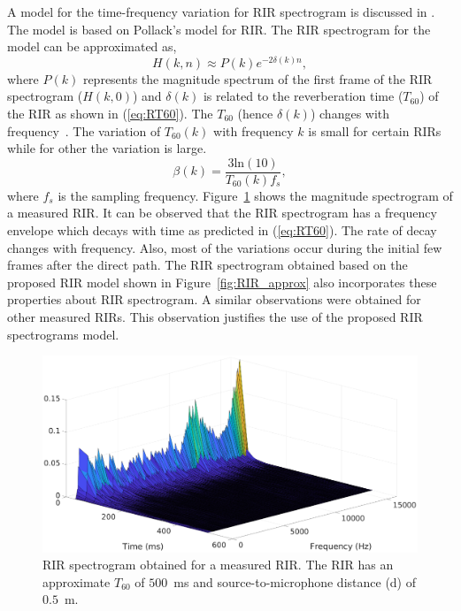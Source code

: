 A model for the time-frequency variation for RIR spectrogram is discussed in \cite{wen2008blind,kuttruff2016room}. The model is based on Pollack's model for RIR. The RIR spectrogram for the model can be approximated as,
\begin{equation}
H(k,n)\approx P(k) e^{-2 \delta(k) n},
\label{eq:PollackModel}
\end{equation} 
where $P(k)$ represents the magnitude spectrum of the first frame of the RIR spectrogram ($H(k,0)$) 
and $\delta(k)$ is related to the reverberation time ($T_{60}$) of the RIR as shown in (\ref{eq:RT60}). The $T_{60}$ (hence $\delta (k)$) changes with frequency~\cite{jeub2010we}. The variation of $T_{60}(k)$ with frequency $k$ is small for certain RIRs while for other the variation is large.  
\begin{equation}
\beta (k)= \dfrac{3\text{ln}(10)}{T_{60}(k) f_s},
\label{eq:RT60}
\end{equation}
where $f_s$ is the sampling frequency. Figure~\ref{fig:RIR_spectrogram} shows the magnitude spectrogram of a measured RIR. It can be observed that the RIR spectrogram has a frequency envelope which decays with time as predicted in (\ref{eq:RT60}). The rate of decay changes with frequency. Also, most of the variations occur during the initial few frames after the direct path. The RIR spectrogram obtained based on the proposed RIR model shown in Figure~\ref{fig:RIR_approx} also incorporates these properties about RIR spectrogram.  A similar observations were obtained for other measured RIRs. This observation justifies the use of the proposed RIR spectrograms model. 
\begin{figure}
\centering
\includegraphics[width=\linewidth]{fig/RIR_original.eps}
\caption{RIR spectrogram obtained for a measured RIR. The RIR has an approximate $T_{60}$ of $500$~ms and source-to-microphone distance (d) of $0.5$~m.}
\label{fig:RIR_spectrogram}
\end{figure}
\fi

